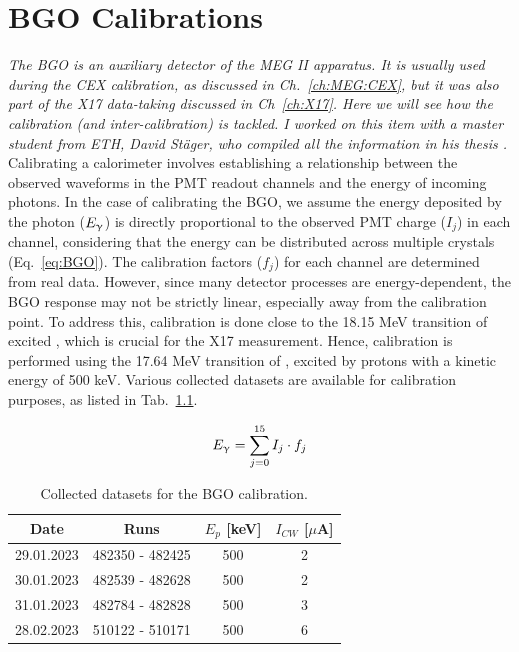 \chapter{BGO Calibrations}
\begin{refsection}
{\itshape The BGO is an auxiliary detector of the MEG II apparatus. It is usually used during the CEX calibration, as discussed in Ch.~\ref{ch:MEG:CEX}, but it was also part of the X17 data-taking discussed in Ch~\ref{ch:X17}. Here we will see how the calibration (and inter-calibration) is tackled. I worked on this item with a master student from ETH, David St\"{a}ger, who compiled all the information in his thesis \cite{David}.}
\label{ch:BGO}\\

\noindent
Calibrating a calorimeter involves establishing a relationship between the observed waveforms in the PMT readout channels and the energy of incoming photons. 
In the case of calibrating the BGO, we assume the energy deposited by the photon ($E_\upgamma$) is directly proportional to the observed PMT charge ($I_j$) in each channel, considering that the energy can be distributed across multiple crystals (Eq.~\ref{eq:BGO}). 
The calibration factors ($f_j$) for each channel are determined from real data. 
However, since many detector processes are energy-dependent, the BGO response may not be strictly linear, especially away from the calibration point. To address this, calibration is done close to the 18.15 MeV transition of excited , which is crucial for the X17 measurement. 
Hence, calibration is performed using the 17.64 MeV transition of , excited by protons with a kinetic energy of 500 keV. 
Various collected datasets are available for calibration purposes, as listed in Tab.~\ref{tab:datasets}.

\begin{equation}
    E_\upgamma = \sum_{j=0}^{15}I_j\cdot f_j
    \label{eq:BGO}
\end{equation}

    \begin{table}[h]
        \centering
        \begin{tabular}{|c|c|c|c|}
        \hline
        Date & Runs & $E_p$ [keV] & $I_{CW}$ [$\mu$A] \\
        \hline
        29.01.2023 & 482350 - 482425 & 500 & 2 \\
        30.01.2023 & 482539 - 482628 & 500 & 2 \\
        31.01.2023 & 482784 - 482828 & 500 & 3 \\
        28.02.2023 & 510122 - 510171 & 500 & 6 \\
        \hline
        \end{tabular}
        \caption{Collected datasets for the BGO calibration.}
    \label{tab:datasets}
    \end{table}


\end{refsection}
